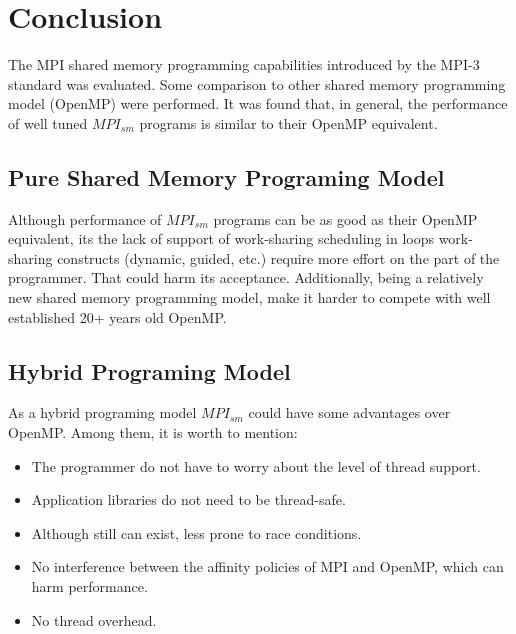 \section{Conclusion} 

The MPI shared memory programming capabilities introduced by the MPI-3 standard was evaluated. Some comparison to other shared memory programming model (OpenMP) were performed. It was found that, in general, the performance of well tuned $MPI_{sm}$ programs is similar to their OpenMP equivalent.



\subsection*{Pure Shared Memory Programing Model}

Although performance of $MPI_{sm}$ programs can be as good as their OpenMP equivalent, its the lack of support of  work-sharing scheduling in loops work-sharing constructs (dynamic, guided, etc.) require more effort on the part of the programmer. That could harm its acceptance. Additionally, being a relatively new shared memory programming model, make it harder to compete with well established 20+ years old OpenMP.


\subsection*{Hybrid Programing Model}

As a hybrid programing model $MPI_{sm}$ could have some advantages over OpenMP. Among them, it is worth to mention:

\begin{itemize} 
  \item The programmer do not have to worry about the level of thread support.
  \item Application libraries do not need to be thread-safe.
  \item Although still can exist, less prone to race conditions.
  \item No interference between the affinity policies of MPI and OpenMP, which can harm performance.  
  \item No thread overhead.
\end{itemize}



